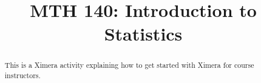 \documentclass{xourse}
\title{MTH 140: Introduction to Statistics}
\begin{document}
  
\begin{abstract} %
This is a Ximera activity explaining how to get  
started with Ximera for course instructors.  
\end{abstract}  
\maketitle  
 

 
\end{document}

